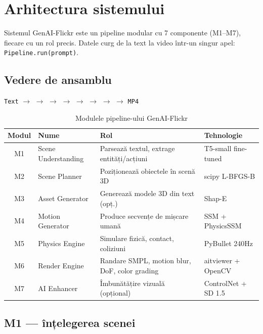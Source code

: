 \chapter{Arhitectura sistemului}
\label{chap:arhitectura}

Sistemul GenAI-Flickr este un pipeline modular cu 7 componente (M1--M7), fiecare cu un rol precis.  Datele curg de la text la video într-un singur apel: \texttt{Pipeline.run(prompt)}.

\section{Vedere de ansamblu}

\begin{center}
\texttt{Text} $\rightarrow$  $\rightarrow$  $\rightarrow$  $\rightarrow$  $\rightarrow$  $\rightarrow$  $\rightarrow$  $\rightarrow$ \texttt{MP4}
\end{center}

\begin{table}[h]
\centering
\begin{tabular}{c l l l}
\hline
\textbf{Modul} & \textbf{Nume} & \textbf{Rol} & \textbf{Tehnologie} \\
\hline
M1 & Scene Understanding & Parsează textul, extrage entități/acțiuni & T5-small fine-tuned \\
M2 & Scene Planner & Poziționează obiectele în scenă 3D & scipy L-BFGS-B \\
M3 & Asset Generator & Generează modele 3D din text (opț.) & Shap-E \\
M4 & Motion Generator & Produce secvențe de mișcare umană & SSM + PhysicsSSM \\
M5 & Physics Engine & Simulare fizică, contact, coliziuni & PyBullet 240Hz \\
M6 & Render Engine & Randare SMPL, motion blur, DoF, color grading & aitviewer + OpenCV \\
M7 & AI Enhancer & Îmbunătățire vizuală (opțional) & ControlNet + SD 1.5 \\
\hline
\end{tabular}
\caption{Modulele pipeline-ului GenAI-Flickr}
\label{tab:modules}
\end{table}

\section{M1 --- înțelegerea scenei}

